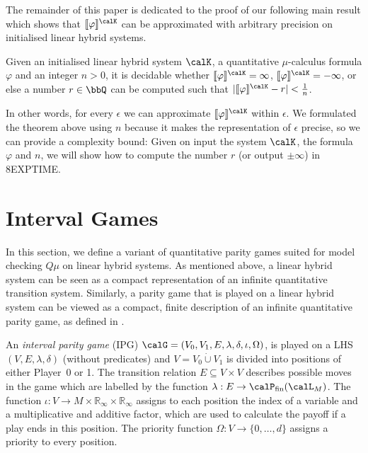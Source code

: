 \documentclass[fleqn,envcountsame]{LMCS}
\newcommand{\muc}{$\mu$-calculus\xspace}
\newcommand{\qmu}{quantitative \muc}
\newcommand{\Qmu}{\ensuremath{Q\mu}\xspace}
\newcommand{\pzero}{Player~$0$\xspace}
\newcommand{\Rinf}{\ensuremath{\mathbb{R}_{\infty}}}
\newcommand{\Pot}{\ensuremath{\calP}}
\newcommand{\semk}[1]{\ensuremath{\llbracket#1\rrbracket^{\calK}}}
\newcommand{\labels}{\ensuremath{\lambda}}
\newcommand{\coeff}{\ensuremath{\delta}} \newcommand{\indexi}{\ensuremath{\iota}}
\renewcommand\phi{\varphi}
\newcommand{\cupdot}{\mathbin{\dot{\cup}}}
\begin{document}
The remainder of this paper is dedicated to the proof of our following
main result which shows that $\semk{\phi}$ can be approximated
with arbitrary precision on initialised linear hybrid systems.

\begin{thm} \label{mainthm}
Given an initialised linear hybrid system $\calK$, a \qmu formula $\phi$
and an integer $n > 0$, it is decidable whether $\semk{\phi} = \infty$,
$\semk{\phi} = -\infty$, or else a number $r \in \bbQ$ can be computed
such that $|\semk{\phi} - r| < \frac 1 n$.
\end{thm}

In other words, for every $\epsilon$ we can approximate $\semk{\phi}$
within $\epsilon$. We formulated the theorem above using $n$ because it
makes the representation of $\epsilon$ precise, so we can provide a complexity
bound: Given on input the system $\calK$, the formula $\phi$ and $n$, we will
show how to compute the number $r$ (or output $\pm\infty$) in \textsc{8EXPTIME}.


\section{Interval Games}\label{sec_ipg}

In this section, we define a variant of quantitative parity games
suited for model checking \Qmu on linear hybrid systems.
As mentioned above, a linear hybrid system can be seen as a compact 
representation of an infinite quantitative transition system. 
Similarly, a parity game that is played on a linear hybrid
system can be viewed as a compact, finite description of an
infinite quantitative parity game, as defined in \cite{FGK10}.

\begin{defi} \label{def-ipg}
An \emph{interval parity game} (IPG)
$\calG = (V_0, V_1, E, \labels, \coeff, \indexi, \Omega)$,
is played on a LHS $(V, E, \labels, \coeff)$ (without predicates) and
$V = V_0 \cupdot V_1$ is divided into positions of either \pzero or 1. 
The transition relation  $E \subseteq V \times V$ describes possible
moves in the game which are labelled by the function
$\labels : E \to \Pot_{\mathrm{fin}}(\calL_M)$.
The function $\indexi : V \to M \times \Rinf \times \Rinf$ assigns to each
position the index of a variable and a multiplicative and additive factor,
which are used to calculate the payoff if a play ends in this position.
The priority function $\Omega : V \to \{0, \ldots, d\}$
assigns a priority to every position.
\end{defi}
\end{document}
